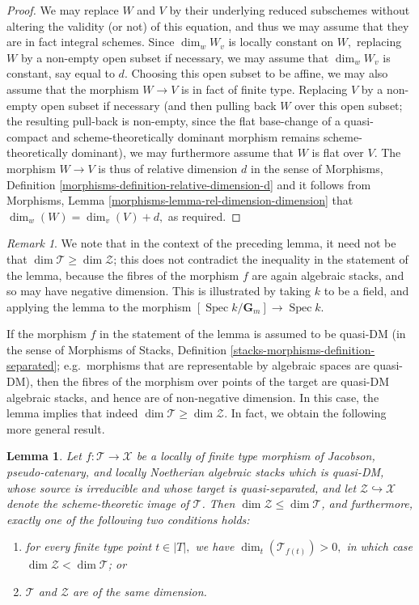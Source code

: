 \documentclass{stacks-project}
\theoremstyle{plain}
\newtheorem{lemma}[subsection]{Lemma}
\theoremstyle{definition}
\theoremstyle{remark}
\newtheorem{remark}[subsection]{Remark}
\numberwithin{equation}{subsection}
\def\Spec{\mathop{\mathrm{Spec}}}
\begin{document}
\begin{proof}
\medskip\noindent
We may replace $W$ and $V$ by their underlying reduced subschemes
without altering the validity (or not) of this equation,
and thus we may assume that they are in fact integral schemes.
Since $\dim_w W_v$ is locally constant on $W,$ replacing $W$
by a non-empty open subset if necessary, we may assume that $\dim_w W_v$
is constant, say equal to $d$.  Choosing this open subset to be affine,
we may also assume that the morphism $W\to V$ is in fact of finite type.
Replacing $V$ by a non-empty open subset if necessary
(and then pulling back $W$ over this open subset; the resulting pull-back
is non-empty, since the flat base-change of a quasi-compact
and scheme-theoretically
dominant morphism remains scheme-theoretically dominant),
we may furthermore assume that $W$ is flat over $V$.
The morphism $W\to V$ is thus of relative dimension $d$
in the sense of
Morphisms, Definition
\ref{morphisms-definition-relative-dimension-d}
and it follows from
Morphisms, Lemma \ref{morphisms-lemma-rel-dimension-dimension}
that $\dim_w(W) = \dim_v(V) + d,$ as required.
\end{proof}

\begin{remark}
\label{remark-negative-dimension}
We note that in the context of the preceding lemma,
it need not be that $\dim \mathcal{T} \geq \dim \mathcal{Z}$; this does
not contradict the inequality in the statement of the lemma, because
the fibres of the morphism $f$ are again algebraic stacks, and
so may have negative dimension.  This is illustrated by taking
$k$ to be a field, and applying the lemma to the morphism
$[\Spec k/\mathbf{G}_m] \to \Spec k$.

\medskip\noindent
If the morphism $f$ in the statement of the lemma is assumed
to be quasi-DM (in the sense of
Morphisms of Stacks, Definition
\ref{stacks-morphisms-definition-separated}; e.g.\ morphisms that are
representable by algebraic spaces are quasi-DM),
then the fibres of the morphism over points of the target
are quasi-DM algebraic stacks, and hence are of non-negative
dimension.  In this case, the lemma implies
that indeed $\dim \mathcal{T} \geq \dim \mathcal{Z}$.  In fact, we obtain
the following more general result.
\end{remark}

\begin{lemma}
\label{lemma-dims-of-images-two}
Let $f: \mathcal{T} \to \mathcal{X}$ be a locally of finite type
morphism of Jacobson, pseudo-catenary, and locally Noetherian
algebraic stacks
which is quasi-DM,
whose source is irreducible and whose target is quasi-separated,
and let $\mathcal{Z} \hookrightarrow \mathcal{X}$ denote the scheme-theoretic
image of $\mathcal{T}$.
Then $\dim \mathcal{Z} \leq \dim \mathcal{T}$,
and furthermore, exactly one of the following two conditions holds:
\begin{enumerate}
\item for every finite type point $t \in |T|,$
we have
$\dim_t(\mathcal{T}_{f(t)}) > 0,$ in which
case $\dim \mathcal{Z} < \dim \mathcal{T}$; or
\item   $\mathcal{T}$ and $\mathcal{Z}$
are of the same dimension.
\end{enumerate}
\end{lemma}
\end{document}
